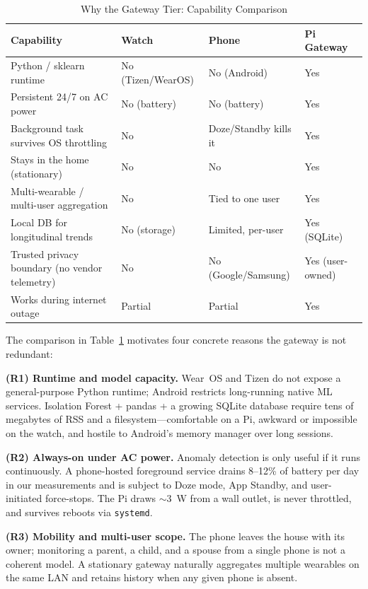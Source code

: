 \documentclass[conference]{IEEEtran}
\begin{document}
\begin{table}[htbp]
\caption{Why the Gateway Tier: Capability Comparison}
\label{tab:tier_comparison}
\centering
\footnotesize
\begin{tabularx}{\columnwidth}{lXXX}
\toprule
\textbf{Capability} & \textbf{Watch} & \textbf{Phone} & \textbf{Pi Gateway} \\
\midrule
Python / sklearn runtime & No (Tizen/WearOS) & No (Android) & Yes \\
Persistent 24/7 on AC power & No (battery) & No (battery) & Yes \\
Background task survives OS throttling & No & Doze/Standby kills it & Yes \\
Stays in the home (stationary) & No & No & Yes \\
Multi-wearable / multi-user aggregation & No & Tied to one user & Yes \\
Local DB for longitudinal trends & No (storage) & Limited, per-user & Yes (SQLite) \\
Trusted privacy boundary (no vendor telemetry) & No & No (Google/Samsung) & Yes (user-owned) \\
Works during internet outage & Partial & Partial & Yes \\
\bottomrule
\end{tabularx}
\end{table}

The comparison in Table~\ref{tab:tier_comparison} motivates four concrete reasons the gateway is not redundant:

\textbf{(R1) Runtime and model capacity.} Wear~OS and Tizen do not expose a general-purpose Python runtime; Android restricts long-running native ML services. Isolation Forest + pandas + a growing SQLite database require tens of megabytes of RSS and a filesystem---comfortable on a Pi, awkward or impossible on the watch, and hostile to Android's memory manager over long sessions.

\textbf{(R2) Always-on under AC power.} Anomaly detection is only useful if it runs continuously. A phone-hosted foreground service drains 8--12\% of battery per day in our measurements and is subject to Doze mode, App Standby, and user-initiated force-stops. The Pi draws $\sim$3~W from a wall outlet, is never throttled, and survives reboots via \texttt{systemd}.

\textbf{(R3) Mobility and multi-user scope.} The phone leaves the house with its owner; monitoring a parent, a child, and a spouse from a single phone is not a coherent model. A stationary gateway naturally aggregates multiple wearables on the same LAN and retains history when any given phone is absent.
\end{document}
